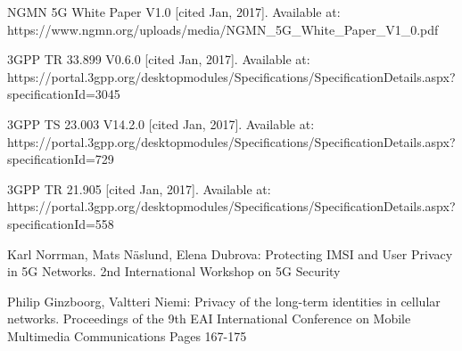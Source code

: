 \documentclass[lnicst,sechang,a4paper]{svmultln}
\begin{document}
\begin{thebibliography}{4}

 NGMN 5G White Paper V1.0 [cited Jan, 2017]. Available at: https://www.ngmn.org/uploads/media/NGMN\_5G\_White\_Paper\_V1\_0.pdf

 3GPP TR 33.899 V0.6.0 [cited Jan, 2017]. Available at: https://portal.3gpp.org/desktopmodules/Specifications/SpecificationDetails.aspx?\\specificationId=3045

 3GPP TS 23.003 V14.2.0 [cited Jan, 2017]. Available at: https://portal.3gpp.org/desktopmodules/Specifications/SpecificationDetails.aspx?\\specificationId=729

 3GPP TR 21.905 [cited Jan, 2017]. Available at: https://portal.3gpp.org/desktopmodules/Specifications/SpecificationDetails.aspx?\\specificationId=558


 Karl Norrman, Mats N\"aslund, Elena Dubrova: Protecting IMSI and User Privacy in 5G Networks. 2nd International Workshop on 5G Security

 Philip Ginzboorg,  Valtteri Niemi: Privacy of the long-term identities in cellular networks. Proceedings of the 9th EAI International Conference on Mobile Multimedia Communications
Pages 167-175




\end{thebibliography}
\end{document}
